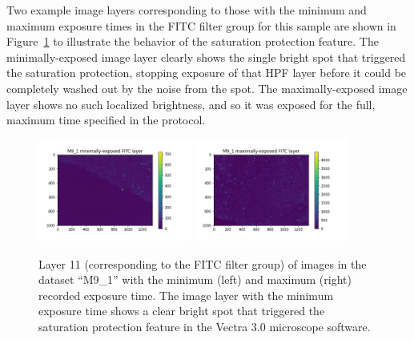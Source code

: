 \documentclass[letterpaper,11pt]{article}
\newcommand{\reffig}[1]{Figure~\ref{#1}}
\begin{document}
Two example image layers corresponding to those with the minimum and maximum exposure times in the FITC filter group for this sample are shown in \reffig{fig:max_min_M9_1_images} to illustrate the behavior of the saturation protection feature. The minimally-exposed image layer clearly shows the single bright spot that triggered the saturation protection, stopping exposure of that HPF layer before it could be completely washed out by the noise from the spot. The maximally-exposed image layer shows no such localized brightness, and so it was exposed for the full, maximum time specified in the protocol.

\begin{figure}[!ht]
\centering
\includegraphics[width=0.45\textwidth]{images/introduction/min_exposure_M9_1_image}
\includegraphics[width=0.45\textwidth]{images/introduction/max_exposure_M9_1_image}
\caption{\footnotesize Layer 11 (corresponding to the FITC filter group) of images in the dataset ``M9\_1'' with the minimum (left) and maximum (right) recorded exposure time. The image layer with the minimum exposure time shows a clear bright spot that triggered the saturation protection feature in the Vectra 3.0 microscope software.}
\label{fig:max_min_M9_1_images}
\end{figure}

\end{document}
